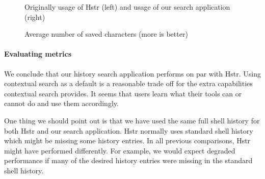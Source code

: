 \begin{figure}
\centering
{}\hfill
{}
\caption{Average number of saved characters (more is better)}
\small{Originally usage of Hstr (left) and usage of our search application (right)}
\label{eval-metrics-plot-dist-1-chars}
\end{figure}


\paragraph{Evaluating metrics}

We conclude that our history search application performs on par with Hstr. Using contextual search as a default is a reasonable trade off for the extra capabilities contextual search provides. It seems that users learn what their tools can or cannot do and use them accordingly.


One thing we should point out is that we have used the same full shell history for both Hstr and our search application. Hstr normally uses standard shell history which might be missing some history entries.
In all previous comparisons, Hstr might have performed differently. For example, we would expect degraded performance if many of the desired history entries were missing in the standard shell history.


